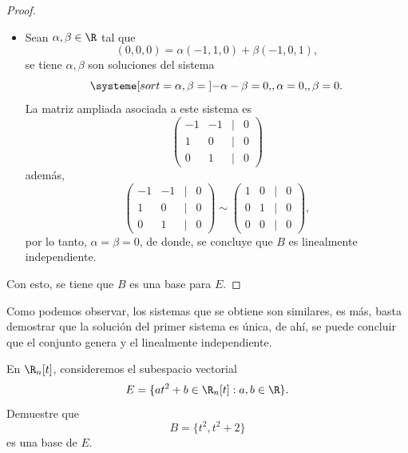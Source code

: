 \documentclass[a4,11pt]{aleph-notas}
\begin{document}
\begin{proof}
\begin{itemize}[leftmargin=*]
\[            \spn(B) = E.
        \]
    \item
        Sean $\alpha,\beta\in\R$ tal que
        \[
            (0,0,0) = \alpha(-1,1,0)+\beta(-1,0,1),
        \]
        se tiene $\alpha,\beta$ son soluciones del sistema
        \[
            \systeme[sort={\alpha,\beta = {}}]{
                -\alpha-\beta = 0{,},
                \alpha = 0{,},
                \beta = 0{.}
            }
        \]
        La matriz ampliada asociada a este sistema es
        \[
            \begin{pmatrix}
                -1 & -1 & | & 0\\
                1 & 0 & | & 0\\
                0 & 1 & | & 0
            \end{pmatrix}
        \]
        además,
        \[
            \begin{pmatrix}
                -1 & -1 & | & 0\\
                1 & 0 & | & 0\\
                0 & 1 & | & 0
            \end{pmatrix}
            \sim
            \begin{pmatrix}
                1 & 0 & | & 0\\
                0 & 1 & | & 0\\
                0 & 0 & | & 0
            \end{pmatrix},
        \]
        por lo tanto, $\alpha=\beta=0$, de donde, se concluye que $B$ es linealmente independiente.
    \end{itemize}
    Con esto, se tiene que $B$ es una base para $E$.
\end{proof}

\begin{advertencia}
    Como podemos observar, los sistemas que se obtiene son similares, es más, basta demostrar que la solución del primer sistema es única, de ahí, se puede concluir que el conjunto genera y el linealmente independiente.
\end{advertencia}


\begin{ejer}
    En $\R_n[t]$, consideremos el subespacio vectorial
    \[
        E = \{at^2+b\in \R_n[t] : a,b\in\R \}.
    \]
    Demuestre que 
    \[
        B = \{t^2 , t^2+2\}
    \]
    es una base de $E$.
\end{ejer}
\end{document}
